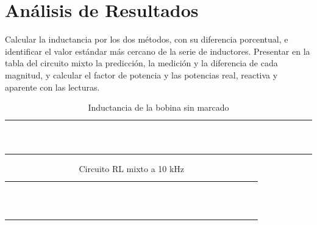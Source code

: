 \documentclass[12pt]{article}
\begin{document}
\section{Análisis de Resultados}\label{sec:analisis}
Calcular la inductancia por los dos métodos, con su diferencia porcentual, e identificar el valor estándar más cercano de la serie de inductores.
\lineablanco
Presentar en la tabla del circuito mixto la predicción, la medición y la diferencia de cada magnitud, y calcular el factor de potencia y las potencias real, reactiva y aparente con las lecturas.
\begin{table}[H]
  \centering
  \caption{Inductancia de la bobina sin marcado}
  \label{tab:registro-1}
  \begin{tabularx}{\linewidth}{>{\raggedright\arraybackslash}X>{\raggedright\arraybackslash}X>{\raggedright\arraybackslash}X>{\raggedright\arraybackslash}X>{\raggedright\arraybackslash}X}
    \rowcolor{iubnavy} \textcolor{white}{\textbf{Método}} & \textcolor{white}{\textbf{Magnitud medida}} & \textcolor{white}{\textbf{Valor medido}} & \textcolor{white}{\textbf{L calculada (mH)}} & \textcolor{white}{\textbf{Diferencia entre métodos (\%)}} \\
    \rule{0pt}{0.8cm} & & & & \\
    \rowcolor{iubfondogris} \rule{0pt}{0.8cm} & & & & \\
    \bottomrule
  \end{tabularx}
\end{table}
\begin{table}[H]
  \centering
  \caption{Circuito RL mixto a 10 kHz}
  \label{tab:registro-2}
  \begin{tabularx}{\linewidth}{>{\raggedright\arraybackslash}X>{\raggedright\arraybackslash}X>{\raggedright\arraybackslash}X>{\raggedright\arraybackslash}X>{\raggedright\arraybackslash}X}
    \rowcolor{iubnavy} \textcolor{white}{\textbf{Magnitud}} & \textcolor{white}{\textbf{Calculado}} & \textcolor{white}{\textbf{Medido}} & \textcolor{white}{\textbf{Unidad}} & \textcolor{white}{\textbf{Diferencia (\%)}} \\
    \rule{0pt}{0.8cm} & & & & \\
    \rowcolor{iubfondogris} \rule{0pt}{0.8cm} & & & & \\
    \rule{0pt}{0.8cm} & & & & \\
    \rowcolor{iubfondogris} \rule{0pt}{0.8cm} & & & & \\
    \rule{0pt}{0.8cm} & & & & \\
    \rowcolor{iubfondogris} \rule{0pt}{0.8cm} & & & & \\
    \rule{0pt}{0.8cm} & & & & \\
    \bottomrule
  \end{tabularx}
\end{table}
\end{document}
